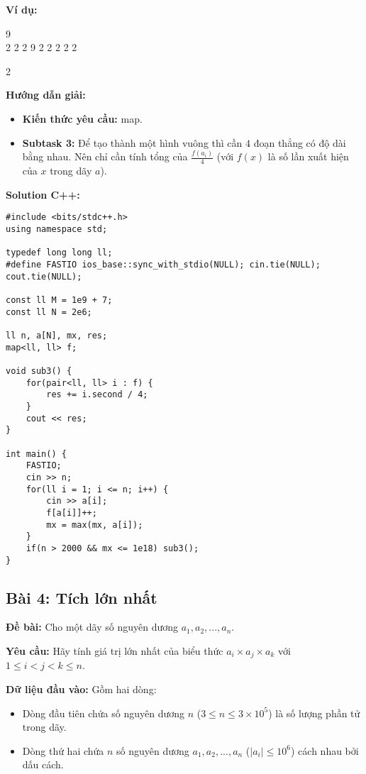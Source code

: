 \documentclass[12pt]{scrartcl}  %
\begin{document}
\textbf{Ví dụ:}
\begin{tcolorbox}[colback=gray!5!white, colframe=blue!50!black, title=Input]
9\\
2 2 2 9 2 2 2 2 2
\end{tcolorbox}
\begin{tcolorbox}[colback=gray!5!white, colframe=green!50!black, title=Output]
2
\end{tcolorbox}

\textbf{Hướng dẫn giải:}
\begin{itemize}
    \item \textbf{Kiến thức yêu cầu:} map.
    \item \textbf{Subtask 3:} Để tạo thành một hình vuông thì cần $4$ đoạn thẳng
    có độ dài bằng nhau. Nên chỉ cần tính tổng của $\frac{f(a_i)}{4}$ (với $f(x)$ là số lần xuất
    hiện của $x$ trong dãy $a$). 
\end{itemize}

\textbf{Solution C++:}
\begin{lstlisting}
#include <bits/stdc++.h>
using namespace std;

typedef long long ll;
#define FASTIO ios_base::sync_with_stdio(NULL); cin.tie(NULL); cout.tie(NULL);

const ll M = 1e9 + 7;
const ll N = 2e6;

ll n, a[N], mx, res;
map<ll, ll> f;

void sub3() {
    for(pair<ll, ll> i : f) {
        res += i.second / 4;
    }
    cout << res;
}

int main() {
    FASTIO;
    cin >> n;
    for(ll i = 1; i <= n; i++) {
        cin >> a[i];
        f[a[i]]++;
        mx = max(mx, a[i]);
    }
    if(n > 2000 && mx <= 1e18) sub3();
}

\end{lstlisting}

\subsection{Bài 4: Tích lớn nhất}
\textbf{Đề bài:}
Cho một dãy số nguyên dương $a_1, a_2, ..., a_n$.

\textbf{Yêu cầu:}
Hãy tính giá trị lớn nhất của biểu thức $a_i \times a_j \times a_k$ với $1 \leq i < j < k \leq n$.

\textbf{Dữ liệu đầu vào:}
Gồm hai dòng:
\begin{itemize}
    \item Dòng đầu tiên chứa số nguyên dương $n$ ($3 \leq n \leq 3 \times 10^5$) là số lượng phần tử trong dãy.
    \item Dòng thứ hai chứa $n$ số nguyên dương $a_1, a_2, ..., a_n$ ($ |a_i| \leq 10^6$) cách nhau bởi dấu cách.
\end{itemize}
\end{document}
